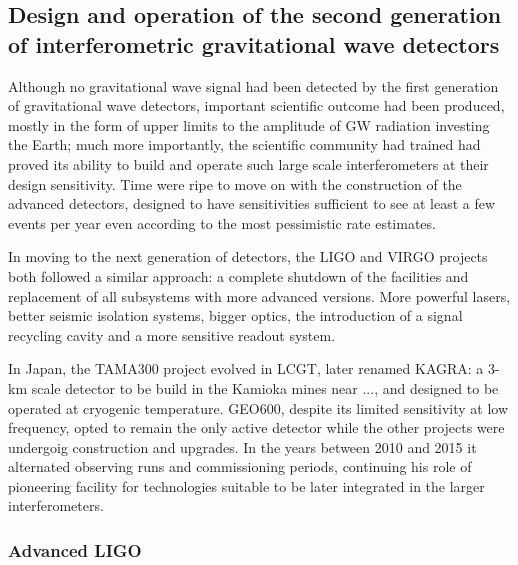 \subsection{Design and operation of the second generation of interferometric gravitational wave detectors}\label{subsec:2ndgen}

Although no gravitational wave signal had been detected by the first generation of gravitational wave detectors, important scientific outcome had been produced, mostly in the form of upper limits to the amplitude of GW radiation investing the Earth; much more importantly, the scientific community had trained had proved its ability to build and operate such large scale interferometers at their design sensitivity. Time were ripe to move on with the construction of the advanced detectors, designed to have sensitivities sufficient to see at least a few events per year even according to the most pessimistic rate estimates.

In moving to the next generation of detectors, the LIGO and VIRGO projects both followed a similar approach: a complete shutdown of the facilities and replacement of all subsystems with more advanced versions. More powerful lasers, better seismic isolation systems, bigger optics, the introduction of a signal recycling cavity and a more sensitive readout system.

In Japan, the TAMA300 project evolved in LCGT, later renamed KAGRA: a 3-km scale detector to be build in the Kamioka mines near ..., and designed to be operated at cryogenic temperature.
GEO600, despite its limited sensitivity at low frequency, opted to remain the only active detector while the other projects were undergoig construction and upgrades. In the years between 2010 and 2015 it alternated observing runs and commissioning periods, continuing his role of pioneering facility for technologies suitable to be later integrated in the larger interferometers.


\subsubsection{Advanced LIGO}

